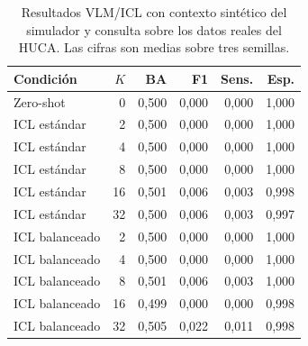 \begin{table}[H]
  \centering
  \small
  \begin{tabular}{lrrrrr}
    \toprule
    Condición & \(K\) & BA & F1 & Sens. & Esp. \\
    \midrule
    Zero-shot & 0  & 0,500 & 0,000 & 0,000 & 1,000 \\
    ICL estándar & 2  & 0,500 & 0,000 & 0,000 & 1,000 \\
    ICL estándar & 4  & 0,500 & 0,000 & 0,000 & 1,000 \\
    ICL estándar & 8  & 0,500 & 0,000 & 0,000 & 1,000 \\
    ICL estándar & 16 & 0,501 & 0,006 & 0,003 & 0,998 \\
    ICL estándar & 32 & 0,500 & 0,006 & 0,003 & 0,997 \\
    ICL balanceado & 2  & 0,500 & 0,000 & 0,000 & 1,000 \\
    ICL balanceado & 4  & 0,500 & 0,000 & 0,000 & 1,000 \\
    ICL balanceado & 8  & 0,501 & 0,006 & 0,003 & 1,000 \\
    ICL balanceado & 16 & 0,499 & 0,000 & 0,000 & 0,998 \\
    ICL balanceado & 32 & 0,505 & 0,022 & 0,011 & 0,998 \\
    \bottomrule
  \end{tabular}
  \caption{Resultados VLM/ICL con contexto sintético del simulador y consulta sobre los datos reales del HUCA. Las cifras son medias sobre tres semillas.}
  \label{tab:app_vlm_huca_synthetic_context}
\end{table}
